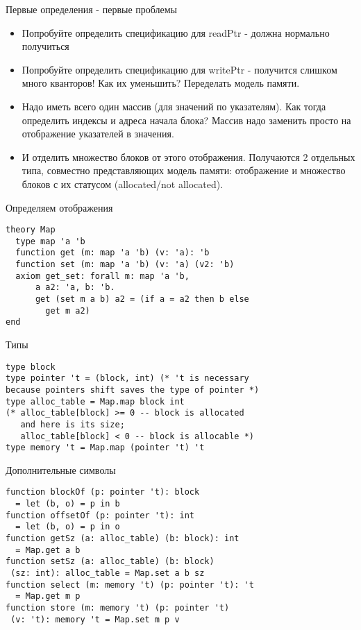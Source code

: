 \documentclass[hyperref={unicode=true}]{beamer}
\begin{document}
    \begin{frame}{Первые определения - первые проблемы}
    \begin{itemize}
    \item
    Попробуйте определить спецификацию для readPtr - должна нормально получиться
    \item
    Попробуйте определить спецификацию для writePtr - получится слишком
    много кванторов! Как их уменьшить? Переделать модель памяти.
    \item
    Надо иметь всего один массив (для значений по указателям).
    Как тогда определить индексы и адреса начала блока? Массив надо заменить
    просто на отображение указателей в значения.
    \item
    И отделить множество блоков от этого отображения. Получаются 2 отдельных
    типа, совместно представляющих модель памяти: отображение и множество блоков
    с их статусом (allocated/not allocated).
    \end{itemize}
    \end{frame}

    \begin{frame}[fragile]{Определяем отображения}
    \begin{lstlisting}
theory Map
  type map 'a 'b
  function get (m: map 'a 'b) (v: 'a): 'b
  function set (m: map 'a 'b) (v: 'a) (v2: 'b)
  axiom get_set: forall m: map 'a 'b,
      a a2: 'a, b: 'b.
      get (set m a b) a2 = (if a = a2 then b else
        get m a2)
end
    \end{lstlisting}
    \end{frame}

    \begin{frame}[fragile]{Типы}
    \begin{lstlisting}
type block
type pointer 't = (block, int) (* 't is necessary
because pointers shift saves the type of pointer *)
type alloc_table = Map.map block int
(* alloc_table[block] >= 0 -- block is allocated
   and here is its size;
   alloc_table[block] < 0 -- block is allocable *)
type memory 't = Map.map (pointer 't) 't
    \end{lstlisting}
    \end{frame}

    \begin{frame}[fragile]{Дополнительные символы}
    \begin{lstlisting}
function blockOf (p: pointer 't): block
  = let (b, o) = p in b
function offsetOf (p: pointer 't): int
  = let (b, o) = p in o
function getSz (a: alloc_table) (b: block): int
  = Map.get a b
function setSz (a: alloc_table) (b: block)
 (sz: int): alloc_table = Map.set a b sz
function select (m: memory 't) (p: pointer 't): 't
  = Map.get m p
function store (m: memory 't) (p: pointer 't)
 (v: 't): memory 't = Map.set m p v
    \end{lstlisting}
    \end{frame}
\end{document}
